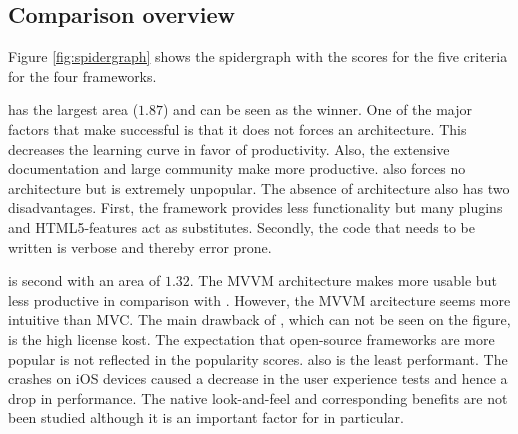 \documentclass[a4paper]{artikel3}
\begin{document}
\begin{table}
\centering
{}
\caption{User experience for \st{}~(\sta), \kendo{}~(\kendoa), \jqm{}~(\jqma) en \lungo{}~(\lungoa).}
\label{tabel:evaluatie-performantie-gebruikerservaring}
\end{table}


\subsection{Comparison overview} %
\label{sec:evaluation-overview}

Figure \ref{fig:spidergraph} shows the spidergraph with the scores for the five criteria for the four frameworks.

\jqma{} has the largest area ($1.87$) and can be seen as the winner.
One of the major factors that make \jqma{} successful is that it does not forces an architecture.
This decreases the learning curve in favor of productivity.
Also,  the extensive documentation and large community make \jqma{} more productive.
\lungo{} also forces no architecture but is extremely unpopular.
The absence of architecture also has two disadvantages.
First,  the framework provides less functionality but many plugins and HTML5-features act as substitutes.
Secondly,  the code that needs to be written is verbose and thereby error prone.

\kendob{} is second with an area of $1.32$.
The MVVM architecture makes \kendob{} more usable but less productive in comparison with \jqma{}.
However,  the MVVM arcitecture seems more intuitive than MVC.
The main drawback of \kendob{},  which can not be seen on the figure, is the high license kost.
The expectation that open-source frameworks are more popular is not reflected in the popularity scores.
\kendob{} also is the least performant.
The crashes on iOS devices caused a decrease in the user experience tests and hence a drop in performance.
The native look-and-feel and corresponding benefits are not been studied although it is an important factor for \kendob{} in particular.
\end{document}
